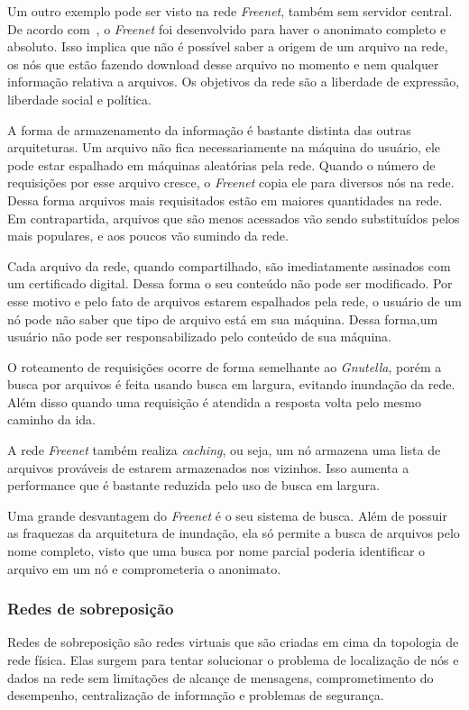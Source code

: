 Um outro exemplo pode ser visto na rede \emph{Freenet}, também sem servidor central. De acordo com~\cite{ian02}, o \emph{Freenet} foi desenvolvido para haver o anonimato completo e absoluto. Isso implica que não é possível saber a origem de um arquivo na rede, os nós que estão fazendo download desse arquivo no momento e nem qualquer informação relativa a arquivos. Os objetivos da rede são a liberdade de expressão, liberdade social e política.

A forma de armazenamento da informação é bastante distinta das outras arquiteturas. Um arquivo não fica necessariamente na máquina do usuário, ele pode estar espalhado em máquinas aleatórias pela rede. Quando o número de requisições por esse arquivo cresce, o \emph{Freenet} copia ele para diversos nós na rede. Dessa forma arquivos mais requisitados estão em maiores quantidades na rede. Em contrapartida, arquivos que são menos acessados vão sendo substituídos pelos mais populares, e aos poucos vão sumindo da rede.

Cada arquivo da rede, quando compartilhado, são imediatamente assinados com um certificado digital. Dessa forma o seu conteúdo não pode ser modificado. Por esse motivo e pelo fato de arquivos estarem espalhados pela rede, o usuário de um nó pode não saber que tipo de arquivo está em sua máquina. Dessa forma,um usuário não pode ser responsabilizado pelo conteúdo de sua máquina.

O roteamento de requisições ocorre de forma semelhante ao \emph{Gnutella}, porém a busca por arquivos é feita usando busca em largura, evitando inundação da rede. Além disso quando uma requisição é atendida a resposta volta pelo mesmo caminho da ida.

A rede \emph{Freenet} também realiza \emph{caching}, ou seja, um nó armazena uma lista de arquivos prováveis de estarem armazenados nos vizinhos. Isso aumenta a performance que é bastante reduzida pelo uso de busca em largura.

Uma grande desvantagem do \emph{Freenet} é o seu sistema de busca. Além de possuir as fraquezas da arquitetura de inundação, ela só permite a busca de arquivos pelo nome completo, visto que uma busca por nome parcial poderia identificar o arquivo em um nó e comprometeria o anonimato.


\subsubsection{Redes de sobreposição}

Redes de sobreposição são redes virtuais que são criadas em cima da topologia de rede física. Elas surgem para tentar solucionar o problema de localização de nós e dados na rede sem limitações de alcançe de mensagens, comprometimento do desempenho, centralização de informação e problemas de segurança.

